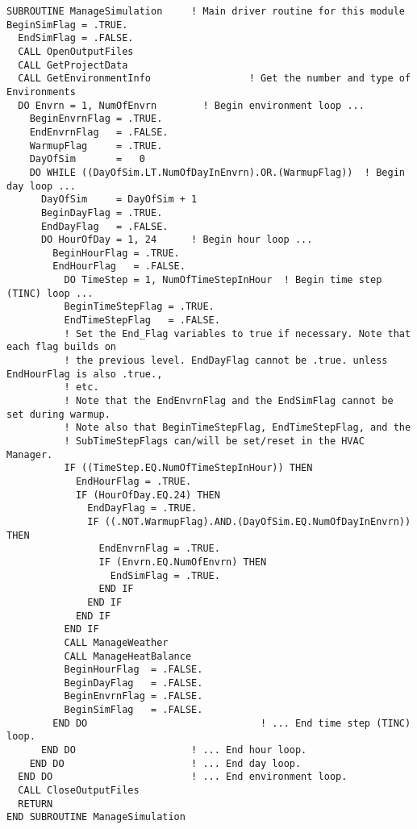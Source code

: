 \begin{lstlisting}
SUBROUTINE ManageSimulation     ! Main driver routine for this module
BeginSimFlag = .TRUE.
  EndSimFlag = .FALSE.
  CALL OpenOutputFiles
  CALL GetProjectData
  CALL GetEnvironmentInfo                 ! Get the number and type of Environments
  DO Envrn = 1, NumOfEnvrn        ! Begin environment loop ...
    BeginEnvrnFlag = .TRUE.
    EndEnvrnFlag   = .FALSE.
    WarmupFlag     = .TRUE.
    DayOfSim       =   0
    DO WHILE ((DayOfSim.LT.NumOfDayInEnvrn).OR.(WarmupFlag))  ! Begin day loop ...
      DayOfSim     = DayOfSim + 1
      BeginDayFlag = .TRUE.
      EndDayFlag   = .FALSE.
      DO HourOfDay = 1, 24      ! Begin hour loop ...
        BeginHourFlag = .TRUE.
        EndHourFlag   = .FALSE.
          DO TimeStep = 1, NumOfTimeStepInHour  ! Begin time step (TINC) loop ...
          BeginTimeStepFlag = .TRUE.
          EndTimeStepFlag   = .FALSE.
          ! Set the End_Flag variables to true if necessary. Note that each flag builds on
          ! the previous level. EndDayFlag cannot be .true. unless EndHourFlag is also .true.,
          ! etc.
          ! Note that the EndEnvrnFlag and the EndSimFlag cannot be set during warmup.
          ! Note also that BeginTimeStepFlag, EndTimeStepFlag, and the
          ! SubTimeStepFlags can/will be set/reset in the HVAC Manager.
          IF ((TimeStep.EQ.NumOfTimeStepInHour)) THEN
            EndHourFlag = .TRUE.
            IF (HourOfDay.EQ.24) THEN
              EndDayFlag = .TRUE.
              IF ((.NOT.WarmupFlag).AND.(DayOfSim.EQ.NumOfDayInEnvrn)) THEN
                EndEnvrnFlag = .TRUE.
                IF (Envrn.EQ.NumOfEnvrn) THEN
                  EndSimFlag = .TRUE.
                END IF
              END IF
            END IF
          END IF
          CALL ManageWeather
          CALL ManageHeatBalance
          BeginHourFlag  = .FALSE.
          BeginDayFlag   = .FALSE.
          BeginEnvrnFlag = .FALSE.
          BeginSimFlag   = .FALSE.
        END DO                              ! ... End time step (TINC) loop.
      END DO                    ! ... End hour loop.
    END DO                      ! ... End day loop.
  END DO                        ! ... End environment loop.
  CALL CloseOutputFiles
  RETURN
END SUBROUTINE ManageSimulation
\end{lstlisting}

